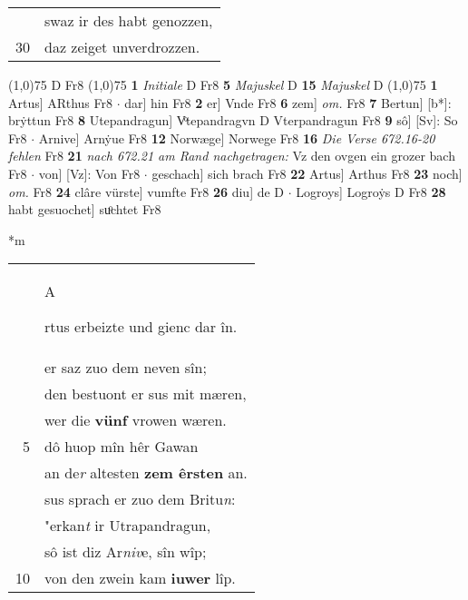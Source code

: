 \documentclass[8pt,a4paper,notitlepage]{article}
\begin{document}
\begin{table}[ht]
\begin{minipage}[t]{0.5\linewidth}
\begin{tabular}{rl}
 & swaz ir des habt genozzen,\\ 
30 & daz zeiget unverdrozzen.\\ 
\end{tabular}
\scriptsize
\line(1,0){75} \newline
D Fr8 \newline
\line(1,0){75} \newline
\textbf{1} \textit{Initiale} D Fr8  \textbf{5} \textit{Majuskel} D  \textbf{15} \textit{Majuskel} D  \newline
\line(1,0){75} \newline
\textbf{1} Artus] ARthus Fr8  $\cdot$ dar] hin Fr8 \textbf{2} er] Vnde Fr8 \textbf{6} zem] \textit{om.} Fr8 \textbf{7} Bertun] [b*]: brẏttun Fr8 \textbf{8} Utepandragun] Vͦtepandragvn D Vterpandragun Fr8 \textbf{9} sô] [Sv]: So Fr8  $\cdot$ Arnive] Arnẏue Fr8 \textbf{12} Norwæge] Norwege Fr8 \textbf{16} \textit{Die Verse 672.16-20 fehlen} Fr8  \textbf{21} \textit{nach 672.21 am Rand nachgetragen:} Vz den ovgen ein grozer bach Fr8   $\cdot$ von] [Vz]: Von Fr8  $\cdot$ geschach] sich brach Fr8 \textbf{22} Artus] Arthus Fr8 \textbf{23} noch] \textit{om.} Fr8 \textbf{24} clâre vürste] vumfte Fr8 \textbf{26} diu] de D  $\cdot$ Logroys] Logroẏs D Fr8 \textbf{28} habt gesuochet] suͦchtet Fr8 \newline
\end{minipage}
\hspace{0.5cm}
\begin{minipage}[t]{0.5\linewidth}
\small
\begin{center}*m
\end{center}
\begin{tabular}{rl}
 & \begin{large}A\end{large}rtus erbeizte und gienc dar în.\\ 
 & er saz zuo dem neven sîn;\\ 
 & den bestuont er sus mit mæren,\\ 
 & wer die \textbf{vünf} vrowen wæren.\\ 
5 & dô huop mîn hêr Gawan\\ 
 & an de\textit{r} altesten \textbf{zem êrsten} an.\\ 
 & sus sprach er zuo dem Britu\textit{n}:\\ 
 & "erkan\textit{t} ir Utrapandragun,\\ 
 & sô ist diz Ar\textit{niv}e, sîn wîp;\\ 
10 & von den zwein kam \textbf{iuwer} lîp.\\ 

\end{tabular}
\end{minipage}
\end{table}
\end{document}
